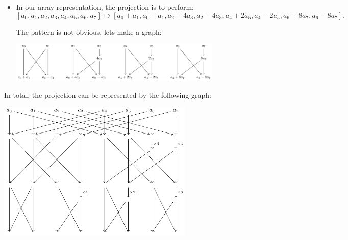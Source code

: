 \begin{frame}
    \begin{itemize}
        \item In our array representation, the projection is to perform:
        \[ 
        [a_{0}, a_{1}, a_{2}, a_{3}, a_{4}, a_{5}, a_{6}, a_{7}] \mapsto 
        [a_{0} + a_{1}, a_{0} - a_{1}, a_{2} + 4a_{3}, a_{2} - 4a_{3}, a_{4} + 2a_{5}, a_{4} - 2a_{5}, a_{6} + 8a_{7}, a_{6} - 8a_{7}].
        \]
    
        The pattern is not obvious, lets make a graph: 
        \begin{center}
            \includegraphics[width=0.8\textwidth]{figures/compiled/tikzcd4.pdf}
        \end{center}
        

    \end{itemize}
\end{frame}

\begin{frame}
    In total, the projection can be represented by the following graph:
    \begin{center}
        \includegraphics[width=0.7\textwidth]{figures/compiled/tikzcd5.pdf}
    \end{center}
\end{frame}

